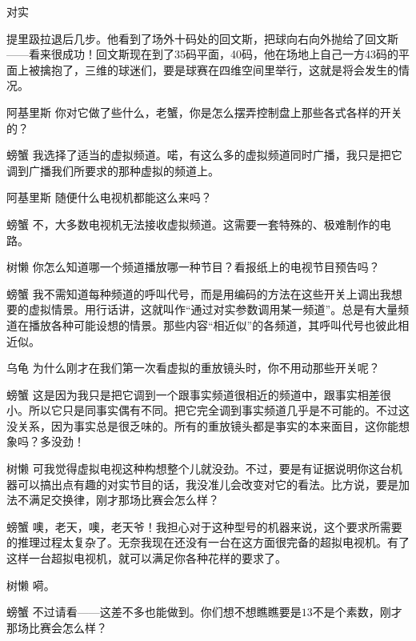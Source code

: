 \begin{dialog}{对实}
\begin{dialogue}
提里趿拉退后几步。他看到了场外十码处的回文斯，把球向右向外抛给了回文斯——看来很成功！回文斯现在到了35码平面，40码，他在场地上自己一方43码的平面上被擒抱了，三维的球迷们，要是球赛在四维空间里举行，这就是将会发生的情况。

\item[阿基里斯]你对它做了些什么，老蟹，你是怎么摆弄控制盘上那些各式各样的开关的？

\item[螃蟹]我选择了适当的虚拟频道。喏，有这么多的虚拟频道同时广播，我只是把它调到广播我们所要求的那种虚拟的频道上。

\item[阿基里斯]随便什么电视机都能这么来吗？

\item[螃蟹]不，大多数电视机无法接收虚拟频道。这需要一套特殊的、极难制作的电路。

\item[树懒]你怎么知道哪一个频道播放哪一种节目？看报纸上的电视节目预告吗？

\item[螃蟹]我不需知道每种频道的呼叫代号，而是用编码的方法在这些开关上调出我想要的虚拟情景。用行话讲，这就叫作“通过对实参数调用某一频道”。总是有大量频道在播放各种可能设想的情景。那些内容“相近似”的各频道，其呼叫代号也彼此相近似。

\item[乌龟]为什么刚才在我们第一次看虚拟的重放镜头时，你不用动那些开关呢？

\item[螃蟹]这是因为我只是把它调到一个跟事实频道很相近的频道中，跟事实相差很小。所以它只是同事实偶有不同。把它完全调到事实频道几乎是不可能的。不过这没关系，因为事实总是很乏味的。所有的重放镜头都是亊实的本来面目，这你能想象吗？多没劲！

\item[树懒]可我觉得虚拟电视这种构想整个儿就没劲。不过，要是有证据说明你这台机器可以搞出点有趣的对实节目的话，我没准儿会改变对它的看法。比方说，要是加法不满足交换律，刚才那场比赛会怎么样？

\item[螃蟹]噢，老天，噢，老天爷！我担心对于这种型号的机器来说，这个要求所需要的推理过程太复杂了。无奈我现在还没有一台在这方面很完备的超拟电视机。有了这样一台超拟电视机，就可以满足你各种花样的要求了。

\item[树懒]嗬。

\item[螃蟹]不过请看——这差不多也能做到。你们想不想瞧瞧要是$13$不是个素数，刚才那场比赛会怎么样？


\end{dialogue}
\end{dialog}
